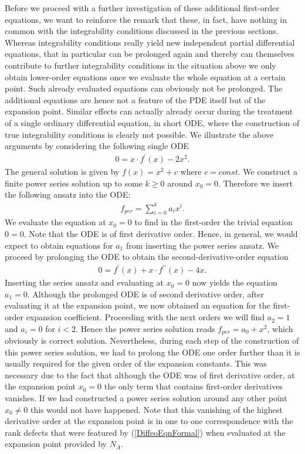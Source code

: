 Before we proceed with a further investigation of these additional first-order equations, we want to reinforce the remark that these, in fact, have nothing in common with the integrability conditions discussed in the previous sections. Whereas integrability conditions really yield new independent partial differential equations, that in particular can be prolonged again and thereby can themselves contribute to further integrability conditions in the situation above we only obtain lower-order equations once we evaluate the whole equation at a certain point. Such already evaluated equations can obviously not be prolonged. The additional equations are hence not a feature of the PDE itself but of the expansion point. Similar effects can actually already occur during the treatment of a single ordinary differential equation, in short ODE, where the construction of true integrability conditions is clearly not possible. We illustrate the above arguments by considering the following single ODE
\begin{align}
    0 = x \cdot f^{\prime}(x) - 2x^2.
\end{align}
The general solution is given by $f(x) = x^2 +c$ where $c=const$. We construct a finite power series solution up to some $k \geq 0$ around $x_0 = 0$. Therefore we insert the following ansatz into the ODE:
\begin{align}
    f_{per} = \sum_{i=0}^k a_i x^i.
\end{align}
We evaluate the equation at $x_0=0$ to find in the first-order the trivial equation $0=0$. Note that the ODE is of first derivative order. Hence, in general, we would expect to obtain equations for $a_1$ from inserting the power series ansatz. We proceed by prolonging the ODE to obtain the second-derivative-order equation
\begin{align}
    0 = f^{\prime}(x) + x \cdot f^{\prime \prime}(x) - 4 x.
\end{align}
Inserting the series ansatz and evaluating at $x_0=0$ now yields the equation $a_1=0$. Although the prolonged ODE is of second derivative order, after evaluating it at the expansion point, we now obtained an equation for the first-order expansion coefficient. Proceeding with the next orders we will find $a_2 = 1$ and $a_i = 0$ for $i < 2$. Hence the power series solution reads $f_{per} = a_0 + x^2$, which obviously is correct solution. Nevertheless, during each step of the construction of this power series solution, we had to prolong the ODE one order further than it is usually required for the given order of the expansion constants. This was necessary due to the fact that although the ODE was of first derivative order, at the expansion point $x_0=0$ the only term that contains first-order derivatives vanishes. If we had constructed a power series solution around any other point $x_0 \neq 0$ this would not have happened. Note that this vanishing of the highest derivative order at the expansion point is in one to one correspondence with the rank defects that were featured by (\ref{DiffeoEqnFormal}) when evaluated at the expansion point provided by $N_A$. 

